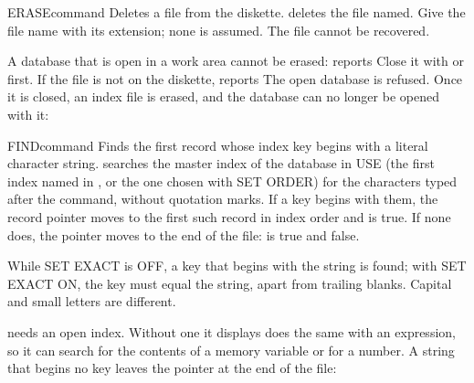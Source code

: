 
\begin{XbaseEntry}{ERASE}{command}
Deletes a file from the diskette.
\Syntax
{}
\Usage
{} deletes the file named.  Give the file name with its extension;
none is assumed.  The file cannot be recovered.

A database that is open in a work area cannot be erased:
 reports   Close it with 
or  first.  If the file is not on the diskette, 
reports 
\Examples
The open database is refused.  Once it is closed, an index file is erased,
and the database can no longer be opened with it:
\end{XbaseEntry}

\begin{XbaseEntry}{FIND}{command}
Finds the first record whose index key begins with a literal character
string.
\Syntax
{}
\Usage
{} searches the master index of the database in USE (the first index
named in , or the one chosen with SET ORDER) for the characters
typed after the command, without quotation marks.  If a key begins with them,
the record pointer moves to the first such record in index order and
 is true.  If none does, the pointer moves to the end of the file:
 is true and  false.

While SET EXACT is OFF, a key that begins with the string is found; with SET
EXACT ON, the key must equal the string, apart from trailing blanks.  Capital
and small letters are different.

 needs an open index.  Without one it displays
\Tips
{} does the same with an expression, so it can search for the
contents of a memory variable or for a number.
\Examples
{}
A string that begins no key leaves the pointer at the end of the file:
\end{XbaseEntry}


